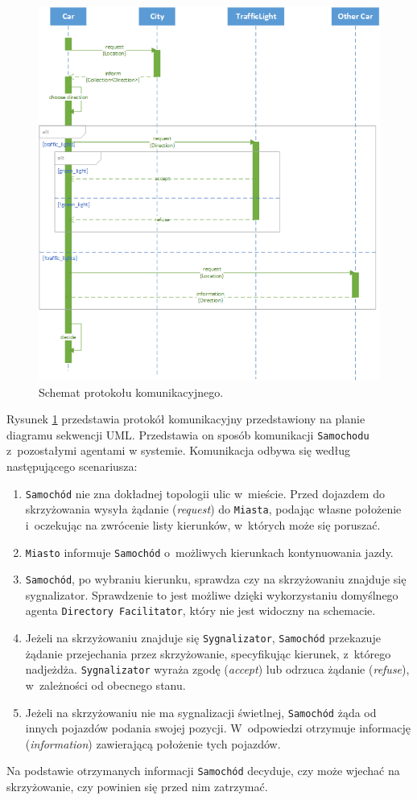 \documentclass[11pt,a4paper]{article}
\begin{document}
\begin{figure}[ht]
    \centering
    \includegraphics[width=.9\textwidth]{protocol.png}
    \caption{Schemat protokołu komunikacyjnego.}
    \label{fig:protocol}
\end{figure}

Rysunek \ref{fig:protocol} przedstawia protokół komunikacyjny przedstawiony na planie diagramu sekwencji UML. Przedstawia on sposób komunikacji \verb+Samochodu+ z~pozostałymi agentami w systemie. Komunikacja odbywa się według następującego scenariusza:

\begin{enumerate}
    \item \verb+Samochód+ nie zna dokładnej topologii ulic w~mieście. Przed dojazdem do skrzyżowania wysyła żądanie (\emph{request}) do \verb+Miasta+, podając własne położenie i~oczekując na zwrócenie listy kierunków, w~których może się poruszać.
    \item \verb+Miasto+ informuje \verb+Samochód+ o~możliwych kierunkach kontynuowania jazdy. 
    \item \verb+Samochód+, po wybraniu kierunku, sprawdza czy na skrzyżowaniu znajduje się sygnalizator. Sprawdzenie to jest możliwe dzięki wykorzystaniu domyślnego agenta \verb+Directory Facilitator+, który nie jest widoczny na schemacie.
    \item Jeżeli na skrzyżowaniu znajduje się \verb+Sygnalizator+, \verb+Samochód+ przekazuje żądanie przejechania przez skrzyżowanie, specyfikując kierunek, z~którego nadjeżdża. \verb+Sygnalizator+ wyraża zgodę (\emph{accept}) lub odrzuca żądanie (\emph{refuse}), w~zależności od obecnego stanu. 
    \item Jeżeli na skrzyżowaniu nie ma sygnalizacji świetlnej, \verb+Samochód+ żąda od innych pojazdów podania swojej pozycji. W~odpowiedzi otrzymuje informację (\emph{information}) zawierającą położenie tych pojazdów.
\end{enumerate}

Na podstawie otrzymanych informacji \verb+Samochód+ decyduje, czy może wjechać na skrzyżowanie, czy powinien się przed nim zatrzymać.
\end{document}
